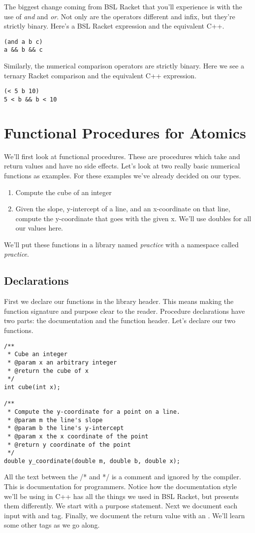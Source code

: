 \documentclass[]{tufte-handout}
\begin{document}
The biggest change coming from BSL Racket that you'll experience is with the use of \textit{and} and \textit{or}.  Not only are the operators different and infix, but they're strictly binary.  Here's a BSL Racket expression and the equivalent C++. 
\begin{verbatim}
(and a b c) 
a && b && c 
\end{verbatim}
Similarly, the numerical comparison operators are strictly binary. Here we see a ternary Racket comparison and the equivalent C++ expression.
\begin{verbatim}
(< 5 b 10)
5 < b && b < 10
\end{verbatim}


\section{Functional Procedures for Atomics}

We'll first look at functional procedures. These are procedures which take and return values and have no side effects.  Let's look at two really basic numerical functions as examples. For these examples we've already decided on our types. 
\begin{enumerate}
\item Compute the cube of an integer
\item Given the slope, y-intercept of a line, and an x-coordinate on that line, compute the y-coordinate that goes with the given x. We'll use doubles for all our values here.
\end{enumerate}
We'll put these functions in a library named \textit{practice} with a namespace called \textit{practice}.


\subsection{Declarations}

First we declare our functions in the library header. This means making the function signature and purpose clear to the reader.  Procedure declarations have two parts: the documentation and the function header.  Let's declare our two functions. 
\begin{verbatim}
/**
 * Cube an integer
 * @param x an arbitrary integer
 * @return the cube of x
 */
int cube(int x);

/**
 * Compute the y-coordinate for a point on a line.
 * @param m the line's slope
 * @param b the line's y-intercept
 * @param x the x coordinate of the point
 * @return y coordinate of the point 
 */
double y_coordinate(double m, double b, double x);

\end{verbatim}
All the text between the /* and */ is a comment and ignored by the compiler.  This is documentation for programmers. Notice how the documentation style we'll be using in C++ has all the things we used in BSL Racket, but presents them differently. We start with a purpose statement. Next we document each input with and \@param tag. Finally, we document the return value with an \@return.  We'll learn some other tags as we go along. 
\end{document}
